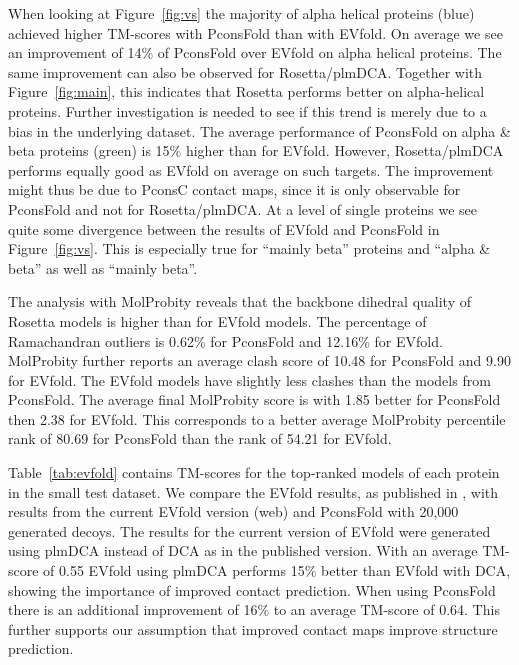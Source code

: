 \documentclass{bioinfo}
\begin{document}
When looking at Figure~\ref{fig:vs} the majority of alpha helical
proteins (blue) achieved higher TM-scores with PconsFold than with
EVfold. On average we see an improvement of 14\% of PconsFold over
EVfold on alpha helical proteins. The same improvement can also be
observed for Rosetta/plmDCA. Together with Figure~\ref{fig:main},
this indicates that Rosetta performs better on alpha-helical
proteins. Further investigation is needed to see if this trend is
merely due to a bias in the underlying dataset. The average
performance of PconsFold on alpha \& beta proteins (green) is 15\%
higher than for EVfold. However, Rosetta/plmDCA performs equally good
as EVfold on average on such targets. The improvement might thus be
due to PconsC contact maps, since it is only observable for PconsFold
and not for Rosetta/plmDCA. At a level of single proteins we see quite
some divergence between the results of EVfold and PconsFold in
Figure~\ref{fig:vs}. This is especially true for ``mainly beta''
proteins and ``alpha \& beta'' as well as ``mainly beta''.

The analysis with MolProbity reveals that the backbone dihedral
quality of Rosetta models is higher than for EVfold models. The
percentage of Ramachandran outliers is 0.62\% for PconsFold and 12.16\% for EVfold. MolProbity further reports an average clash score of
10.48 for PconsFold and 9.90 for EVfold. The EVfold models have
slightly less clashes than the models from PconsFold. The average
final MolProbity score is with 1.85 better for PconsFold then 2.38 for
EVfold. This corresponds to a better average MolProbity percentile
rank of 80.69 for PconsFold than the rank of 54.21 for EVfold.


Table~\ref{tab:evfold} contains TM-scores for the top-ranked models of
each protein in the small test dataset. We compare the EVfold results,
as published in \citeauthor{marks_protein_2011}
\citeyear{marks_protein_2011}, with results from the current EVfold
version (web) and PconsFold with 20,000 generated decoys. The results
for the current version of EVfold were generated using plmDCA instead
of DCA as in the published version. With an average TM-score of 0.55
EVfold using plmDCA performs 15\% better than EVfold with DCA,
showing the importance of improved contact prediction. When using
PconsFold there is an additional improvement of 16\% to an average
TM-score of 0.64. This further supports our assumption that improved
contact maps improve structure prediction.
\end{document}
